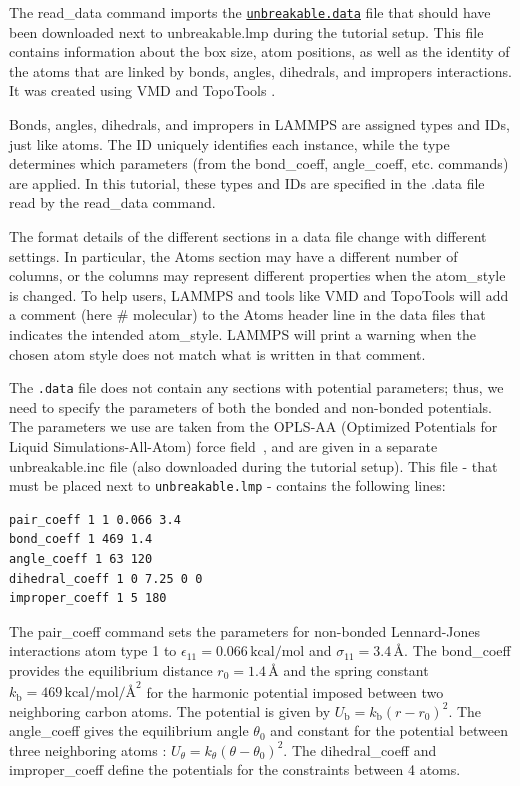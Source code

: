 \documentclass[9pt,tutorial]{livecoms}
\newcommand{\lmpcmd}[1]{\colorbox{listing}{\textcolor{command}{\small{#1}}}} %
\newcommand{\flecmd}[1]{\textcolor{command}{\texttt{#1}}} %
\newcommand{\dwlcmd}[1]{\textcolor{download}{\texttt{#1}}} %
\newcommand{\filepath}{https://raw.githubusercontent.com/lammpstutorials/lammpstutorials-article/main/files/}
\begin{document}
The \lmpcmd{read\_data} command imports the
\href{\filepath tutorial2/unbreakable.data}{\dwlcmd{unbreakable.data}}
file that should have been downloaded next
to \lmpcmd{unbreakable.lmp} during the tutorial setup. This file
contains information about the box size, atom positions, as well as the
identity of the atoms that are
linked by \lmpcmd{bonds}, \lmpcmd{angles}, \lmpcmd{dihedrals}, and
\lmpcmd{impropers} interactions. It was created using VMD and TopoTools
\cite{kohlmeyer2017topotools}.

\begin{note}
{\color{blue}
Bonds, angles, dihedrals, and impropers in LAMMPS are assigned types and IDs, just like atoms.
The ID uniquely identifies each instance, while the type determines which parameters
(from the \lmpcmd{bond\_coeff}, \lmpcmd{angle\_coeff}, etc. commands) are applied.
In this tutorial, these types and IDs are specified in the \lmpcmd{.data} file
read by the \lmpcmd{read\_data} command.}
\end{note}

\begin{note}
The format details of the
different sections in a data file change with different settings.  In
particular, the \lmpcmd{Atoms} section may have a different number of
columns, or the columns may represent different properties when the
\lmpcmd{atom\_style} is changed.  To help users, LAMMPS and tools like
VMD and TopoTools will add a comment (here \lmpcmd{\# molecular}) to the
\lmpcmd{Atoms} header line in the data files that indicates the intended
\lmpcmd{atom\_style}.  LAMMPS will print a warning when the chosen atom
style does not match what is written in that comment.
\end{note}

The \flecmd{.data} file does not contain any sections with potential parameters; thus,
we need to specify the parameters of both the bonded and
non-bonded potentials.  The parameters we use are taken
from the OPLS-AA (Optimized Potentials for Liquid Simulations-All-Atom)
force field~\cite{jorgensenDevelopmentTestingOPLS1996}, and are given
in a separate \lmpcmd{unbreakable.inc} file (also downloaded during
the tutorial setup).  This file - that must be placed
next to \flecmd{unbreakable.lmp} - contains the following lines:
\begin{lstlisting}
pair_coeff 1 1 0.066 3.4
bond_coeff 1 469 1.4
angle_coeff 1 63 120
dihedral_coeff 1 0 7.25 0 0
improper_coeff 1 5 180
\end{lstlisting}
The \lmpcmd{pair\_coeff} command sets the parameters for non-bonded
Lennard-Jones interactions atom type 1 to
$\epsilon_{11} = 0.066 \, \text{kcal/mol}$ and
$\sigma_{11} = 3.4 \, \text{\AA{}}$.  The \lmpcmd{bond\_coeff} provides
the equilibrium distance $r_0= 1.4 \, \text{\AA{}}$ and the
spring constant $k_\text{b} = 469 \, \text{kcal/mol/\AA{}}^2$ for the
harmonic potential imposed between two neighboring carbon atoms.  The potential
is given by $U_\text{b} = k_\text{b} ( r - r_0)^2$.  The
\lmpcmd{angle\_coeff} gives the equilibrium angle $\theta_0$ and
constant for the potential between three neighboring atoms :
$U_\theta = k_\theta ( \theta - \theta_0)^2$.  The
\lmpcmd{dihedral\_coeff} and \lmpcmd{improper\_coeff} define the potentials
for the constraints between 4 atoms.
\end{document}
